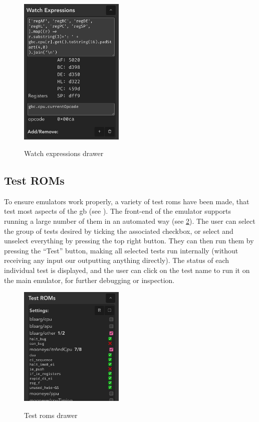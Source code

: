 \documentclass[11pt]{informatics-report}
\begin{document}
\begin{figure}[h]
    \centering
    \includegraphics[width=5cm]{images/watch-expressions}\\
    \caption{Watch expressions drawer}
    \label{fig:watch-expressions}
\end{figure}

\subsection{Test ROMs}
\label{sec:testing-ui}

To ensure emulators work properly, a variety of test \glspl{rom} have been made, that test most aspects of the \gls{gb} (see ). The front-end of the emulator supports running a large number of them in an automated way (see \ref{fig:test-roms-drawer}). The user can select the group of tests desired by ticking the associated checkbox, or select and unselect everything by pressing the top right button. They can then run them by pressing the ``Test'' button, making all selected tests run internally (without receiving any input our outputting anything directly). The status of each individual test is displayed, and the user can click on the test name to run it on the main emulator, for further debugging or inspection.

\begin{figure}[h]
    \centering
    \includegraphics[width=5cm]{images/test-roms}\\
    \caption{Test \glspl{rom} drawer}
    \label{fig:test-roms-drawer}
\end{figure}
\end{document}
